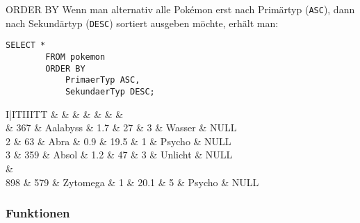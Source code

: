 \begin{sql}{ORDER BY}
    Wenn man alternativ alle Pokémon erst nach Primärtyp (\texttt{ASC}), dann nach Sekundärtyp (\texttt{DESC}) sortiert ausgeben möchte, erhält man:

    \begin{lstlisting}[language=mysql]
        SELECT *
        FROM pokemon
        ORDER BY
            PrimaerTyp ASC,
            SekundaerTyp DESC;
    \end{lstlisting}

    \setcounter{rownum}{0}
    \begin{tabular}{I|ITIIITT}
                                   &     &  &  &  &  &  &  \\                          & 367                       & Aalabyss                 & 1.7                         & 27                          & 3                              & Wasser                         & NULL                             \\
        2                          & 63                        & Abra                     & 0.9                         & 19.5                        & 1                              & Psycho                         & NULL                             \\
        3                          & 359                       & Absol                    & 1.2                         & 47                          & 3                              & Unlicht                        & NULL                             \\
         &                                                                                                                                                                                              \\
        898                        & 579                       & Zytomega                 & 1                           & 20.1                        & 5                              & Psycho                         & NULL                             \\
    \end{tabular}
\end{sql}

\subsubsection{Funktionen}

